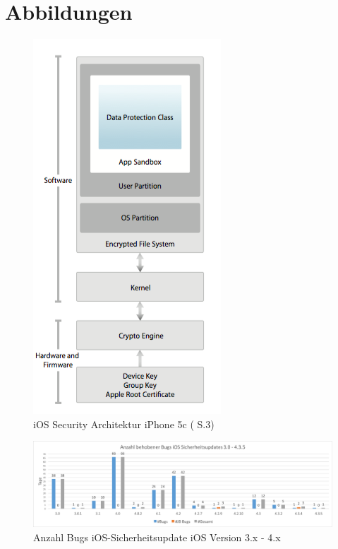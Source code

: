 \newpage
\chapter{Abbildungen}

\begin{figure}[htbp]
    \centering 
		        \includegraphics[scale=0.6]{Bilder/SecArchitektur-iOS7.png}
	\caption {iOS Security Architektur iPhone 5c (\cite{Apple[9]} S.3)}
    \label{fig:iOSSecurityArchitekturiOS7}
\end{figure}

\begin{figure}[htbp]
        \centering
                \includegraphics[scale=0.4]{Bilder/iOSSicherheitsupdate3.png}
        \caption{Anzahl Bugs iOS-Sicherheitsupdate iOS Version 3.x - 4.x}
        \label{fig:AnalyseiOSSicherheitsupdate3}
\end{figure}
     
